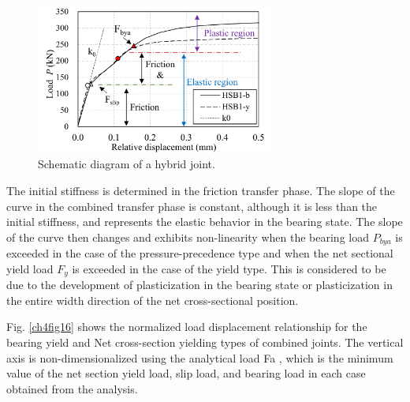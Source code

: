 \begin{figure}[htbp]
    \centering
    \includegraphics[width=0.7\textwidth]{imgs/ch4/fig15.pdf}
    \caption{Schematic diagram of a hybrid joint.}
    \label{ch4fig15}
\end{figure}

The initial stiffness is determined in the friction transfer phase. The slope of the curve in the combined transfer phase is constant, although it is less than the initial stiffness, and represents the elastic behavior in the bearing state. The slope of the curve then changes and exhibits non-linearity when the bearing load $P_{bya}$ is exceeded in the case of the pressure-precedence type and when the net sectional yield load $F_y$ is exceeded in the case of the yield type. This is considered to be due to the development of plasticization in the bearing state or plasticization in the entire width direction of the net cross-sectional position.

Fig. \ref{ch4fig16} shows the normalized load displacement relationship for the bearing yield and Net cross-section yielding types of combined joints. The vertical axis is non-dimensionalized using the analytical load Fa , which is the minimum value of the net section yield load, slip load, and bearing load in each case obtained from the analysis.

